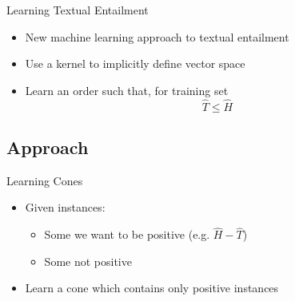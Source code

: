 \documentclass{beamer}
\newlength{\wideitemsep}
\let\olditem\item
\renewcommand{\item}{\setlength{\itemsep}{\wideitemsep}\olditem}
\newcommand{\context}[1]{\ensuremath{\widehat{\mathit{#1}}}}
\begin{document}
\begin{frame}{Learning Textual Entailment}
\begin{itemize}
\item New machine learning approach to textual entailment
\item Use a kernel to implicitly define vector space
\item Learn an order such that, for training set
$$\context{T} \le \context{H}$$
\end{itemize}
\end{frame}


\subsection{Approach}




\begin{frame}{Learning Cones}
\begin{itemize}
\item Given instances:
\begin{itemize}
\item Some we want to be positive (e.g. $\context{H} - \context{T}$)
\item Some not positive
\end{itemize}
\item Learn a cone which contains only positive instances
\end{itemize}
\end{frame}
\end{document}
